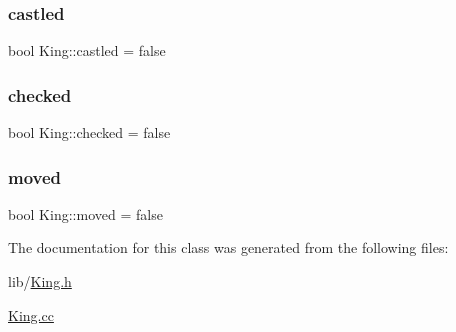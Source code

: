 \subsubsection{\texorpdfstring{castled}{castled}}
{\footnotesize\ttfamily bool King\+::castled = false\hspace{0.3cm}{\ttfamily [private]}}

\mbox{\label{class_king_afd51388c6257f775868f8bde25591a31}} 
\subsubsection{\texorpdfstring{checked}{checked}}
{\footnotesize\ttfamily bool King\+::checked = false\hspace{0.3cm}{\ttfamily [private]}}

\mbox{\label{class_king_a1dd01a0341b4e3f10f55d520e52e4c8f}} 
\subsubsection{\texorpdfstring{moved}{moved}}
{\footnotesize\ttfamily bool King\+::moved = false\hspace{0.3cm}{\ttfamily [private]}}



The documentation for this class was generated from the following files\+:\begin{DoxyCompactItemize}
\item 
lib/\hyperlink{_king_8h}{King.\+h}\item 
\hyperlink{_king_8cc}{King.\+cc}\end{DoxyCompactItemize}

